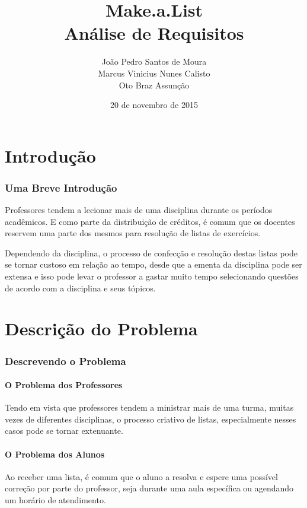 \documentclass[12pt,oneside,a4paper,article]{abntex2}
\title{Make.a.List\\Análise de Requisitos}
\author{João Pedro Santos de Moura\\
		Marcus Vinicius Nunes Calisto\\
		Oto Braz Assunção}
\date{20 de novembro de 2015}
\begin{document}
\maketitle

\pagebreak

\tableofcontents

\pagebreak

\listoffigures

\pagebreak

\listoftables

\part{Introdução}
\section{Uma Breve Introdução}
Professores tendem a lecionar mais de uma disciplina durante os períodos acadêmicos. E como parte da distribuição de créditos, é comum que os docentes reservem uma parte dos mesmos para resolução de listas de exercícios. 

Dependendo da disciplina, o processo de confecção e resolução destas listas pode se tornar custoso em relação ao tempo, desde que a ementa da disciplina pode ser extensa e isso pode levar o professor a gastar muito tempo selecionando questões de acordo com a disciplina e seus tópicos.

\part{Descrição do Problema}
	\section{Descrevendo o Problema}
		\subsection{O Problema dos Professores}
			Tendo em vista que professores tendem a ministrar mais de uma turma, muitas vezes de diferentes disciplinas, o processo criativo de listas, especialmente nesses casos pode se tornar extenuante.
		
		\subsection{O Problema dos Alunos}
			Ao receber uma lista, é comum que o aluno a resolva e espere uma possível correção por parte do professor, seja durante uma aula específica ou agendando um horário de atendimento.
			
\end{document}
